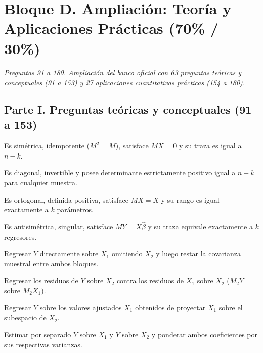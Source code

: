 \section*{Bloque D. Ampliación: Teoría y Aplicaciones Prácticas (70\% / 30\%)}

\noindent\textit{Preguntas 91 a 180. Ampliación del banco oficial con 63 preguntas teóricas y conceptuales (91 a 153) y 27 aplicaciones cuantitativas prácticas (154 a 180).}

\subsection*{Parte I. Preguntas teóricas y conceptuales (91 a 153)}

\begin{opts}
    \item Es simétrica, idempotente ($M^2 = M$), satisface $MX = 0$ y su traza es igual a $n - k$.
    \item Es diagonal, invertible y posee determinante estrictamente positivo igual a $n - k$ para cualquier muestra.
    \item Es ortogonal, definida positiva, satisface $MX = X$ y su rango es igual exactamente a $k$ parámetros.
    \item Es antisimétrica, singular, satisface $MY = X\hat{\beta}$ y su traza equivale exactamente a $k$ regresores.
\end{opts}

\begin{opts}
    \item Regresar $Y$ directamente sobre $X_1$ omitiendo $X_2$ y luego restar la covarianza muestral entre ambos bloques.
    \item Regresar los residuos de $Y$ sobre $X_2$ contra los residuos de $X_1$ sobre $X_2$ ($M_2 Y$ sobre $M_2 X_1$).
    \item Regresar $Y$ sobre los valores ajustados $\hat{X}_1$ obtenidos de proyectar $X_1$ sobre el subespacio de $X_2$.
    \item Estimar por separado $Y$ sobre $X_1$ y $Y$ sobre $X_2$ y ponderar ambos coeficientes por sus respectivas varianzas.
\end{opts}


